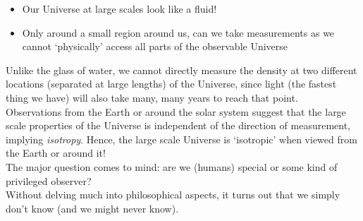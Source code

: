 \begin{itemize}
    \item[$\vartriangleright$] Our Universe at large scales look like a fluid!
    \item[$\vartriangleright$] Only around a small region around us, can we take measurements as we cannot `physically' access all parts of the observable Universe 
\end{itemize}
Unlike the glass of water, we cannot directly measure the density at two different locations (separated at large lengths) of the Universe, since light (the fastest thing we have) will also take many, many years to reach that point. \\[0.2cm]
Observations from the Earth or around the solar system suggest that the large scale properties of the Universe is independent of the direction of measurement, implying \textit{isotropy}. Hence, the large scale Universe is `isotropic' when viewed from the Earth or around it! \\[0.2cm]
The major question comes to mind: are we (humans) special or some kind of privileged observer? \\[0.2cm]
Without delving much into philosophical aspects, it turns out that we simply don't know  (and we might never know). 
